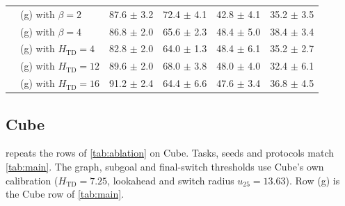 \documentclass{article} %
\newcommand{\Htd}{H_{\mathrm{TD}}}
\begin{document}
\begin{table}[h]
\begin{tabular}{@{}l>{\raggedright\arraybackslash}p{4.3cm}rrrr@{}}
& (g) with $\beta=2$ & 87.6 $\pm$ 3.2 & 72.4 $\pm$ 4.1 & 42.8 $\pm$ 4.1 & 35.2 $\pm$ 3.5 \\
& (g) with $\beta=4$ & 86.8 $\pm$ 2.0 & 65.6 $\pm$ 2.3 & 48.4 $\pm$ 5.0 & 38.4 $\pm$ 3.4 \\
\midrule
& (g) with $\Htd=4$ & 82.8 $\pm$ 2.0 & 64.0 $\pm$ 1.3 & 48.4 $\pm$ 6.1 & 35.2 $\pm$ 2.7 \\
& (g) with $\Htd=12$ & 89.6 $\pm$ 2.0 & 68.0 $\pm$ 3.8 & 48.0 $\pm$ 4.0 & 32.4 $\pm$ 6.1 \\
& (g) with $\Htd=16$ & 91.2 $\pm$ 2.4 & 64.4 $\pm$ 6.6 & 47.6 $\pm$ 3.4 & 36.8 $\pm$ 4.5 \\
\bottomrule
\end{tabular}
\end{table}

\subsection{Cube}
\label{app:ablation-cube}
 repeats the rows of \cref{tab:ablation} on Cube. Tasks, seeds and
protocols match \cref{tab:main}. The graph, subgoal and final-switch thresholds use Cube's own
calibration ($H_{\mathrm{TD}}=7.25$, lookahead and switch radius $u_{25}=13.63$). Row (g) is the Cube row of \cref{tab:main}.
\end{document}
